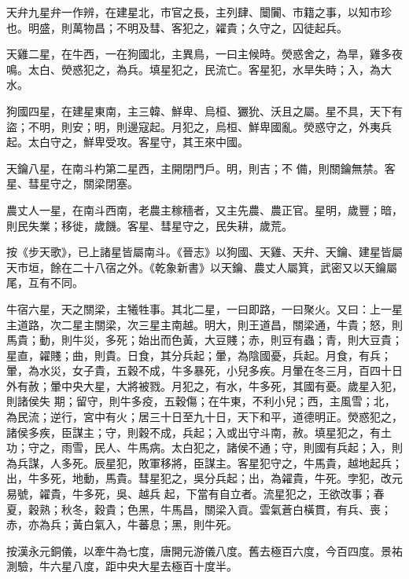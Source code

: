 \begin{pinyinscope}
 天弁九星弁一作辨，在建星北，市官之長，主列肆、闤闠、市籍之事，以知市珍也。明盛，則萬物昌；不明及彗、客犯之，糴貴；久守之，囚徒起兵。



 天雞二星，在牛西，一在狗國北，主異鳥，一曰主候時。熒惑舍之，為旱，雞多夜鳴。太白、熒惑犯之，為兵。填星犯之，民流亡。客星犯，水旱失時；入，為大水。



 狗國四星，在建星東南，主三韓、鮮卑、烏桓、玁狁、沃且之屬。星不具，天下有盜；不明，則安；明，則邊寇起。月犯之，烏桓、鮮卑國亂。熒惑守之，外夷兵起。太白守之，鮮卑受攻。客星守，其王來中國。



 天鑰八星，在南斗杓第二星西，主開閉門戶。明，則吉；不
 備，則關鑰無禁。客星、彗星守之，關梁閉塞。



 農丈人一星，在南斗西南，老農主稼穡者，又主先農、農正官。星明，歲豐；暗，則民失業；移徙，歲饑。客星、彗星守之，民失耕，歲荒。



 按《步天歌》，已上諸星皆屬南斗。《晉志》以狗國、天雞、天弁、天鑰、建星皆屬天市垣，餘在二十八宿之外。《乾象新書》以天鑰、農丈人屬箕，武密又以天鑰屬尾，互有不同。



 牛宿六星，天之關梁，主犧牲事。其北二星，一曰即路，一曰聚火。又曰：上一星主道路，次二星主關梁，次三星主南越。明大，則王道昌，關梁通，牛貴；怒，則馬貴；動，則牛災，多死；始出而色黃，大豆賤；赤，則豆有蟲；青，則大豆貴；星直，糴賤；曲，則貴。日食，其分兵起；暈，為陰國憂，兵起。月食，有兵；暈，為水災，女子貴，五穀不成，牛多暴死，小兒多疾。月暈在冬三月，百四十日外有赦；暈中央大星，大將被戮。月犯之，有水，牛多死，其國有憂。歲星入犯，則諸侯失
 期；留守，則牛多疫，五穀傷；在牛東，不利小兒；西，主風雪；北，為民流；逆行，宮中有火；居三十日至九十日，天下和平，道德明正。熒惑犯之，諸侯多疾，臣謀主；守，則穀不成，兵起；入或出守斗南，赦。填星犯之，有土功；守之，雨雪，民人、牛馬病。太白犯之，諸侯不通；守，則國有兵起；入，則為兵謀，人多死。辰星犯，敗軍移將，臣謀主。客星犯守之，牛馬貴，越地起兵；出，牛多死，地動，馬貴。彗星犯之，吳分兵起；出，為糴貴，牛死。孛犯，改元易號，糴貴，牛多死，吳、越兵
 起，下當有自立者。流星犯之，王欲改事；春夏，穀熟；秋冬，穀貴；色黑，牛馬昌，關梁入貢。雲氣蒼白橫貫，有兵、喪；赤，亦為兵；黃白氣入，牛蕃息；黑，則牛死。



 按漢永元銅儀，以牽牛為七度，唐開元游儀八度。舊去極百六度，今百四度。景祐測驗，牛六星八度，距中央大星去極百十度半。




\end{pinyinscope}
